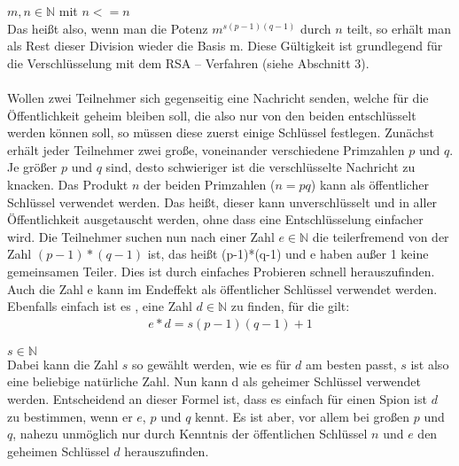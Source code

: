 $m,n \in \mathbb N $ mit $n<=n$ \\
Das heißt also, wenn man die Potenz $m^{s(p-1)(q-1)}$
durch $n$ teilt, so erhält man als Rest dieser Division wieder die Basis m. Diese Gültigkeit ist grundlegend für die Verschlüsselung mit dem RSA – Verfahren (siehe Abschnitt 3).
\\\\
Wollen zwei Teilnehmer sich gegenseitig eine Nachricht senden, welche für die
Öffentlichkeit geheim bleiben soll, die also nur von den beiden entschlüsselt werden
können soll, so müssen diese zuerst einige Schlüssel festlegen. Zunächst erhält
jeder Teilnehmer zwei große, voneinander verschiedene Primzahlen $p$ und $q$. Je
größer $p$ und $q$ sind, desto schwieriger ist die verschlüsselte Nachricht zu knacken.
Das Produkt $n$ der beiden Primzahlen ($n = pq$) kann als öffentlicher Schlüssel
verwendet werden. Das heißt, dieser kann unverschlüsselt und in aller Öffentlichkeit
ausgetauscht werden, ohne dass eine Entschlüsselung einfacher wird. 
Die Teilnehmer suchen nun nach einer Zahl $e \in \mathbb{N}$ die teilerfremend von der Zahl
$(p-1)*(q-1)$ ist, das heißt (p-1)*(q-1) und e haben außer 1 keine gemeinsamen Teiler.
Dies ist durch einfaches Probieren schnell herauszufinden. Auch die Zahl e kann im
Endeffekt als öffentlicher Schlüssel verwendet werden. Ebenfalls einfach ist es , eine Zahl $ d \in \mathbb{N}$ zu finden, für die gilt:
\begin{equation}
	\begin{split}
	e*d = s (p-1) (q-1) + 1 
 	\end{split}
\end{equation}

$s \in \mathbb{N}$
\\
Dabei kann die Zahl $s$ so gewählt werden, wie es für $d$ am besten passt, $s$ ist also
eine beliebige natürliche Zahl. Nun kann d als geheimer Schlüssel verwendet
werden. Entscheidend an dieser Formel ist, dass es einfach für einen Spion ist $d$ zu
bestimmen, wenn er $e$, $p$ und $q$ kennt. Es ist aber, vor allem bei großen $p$ und $q$,
nahezu unmöglich nur durch Kenntnis der öffentlichen Schlüssel $n$ und $e$ den
geheimen Schlüssel $d$ herauszufinden.
